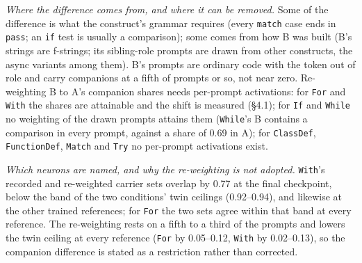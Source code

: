 \documentclass{article}
\begin{document}
\emph{Where the difference comes from, and where it can be removed.} Some of the difference is what the construct's grammar requires (every \texttt{match} case ends in \texttt{pass}; an \texttt{if} test is usually a comparison); some comes from how B was built (B's strings are f-strings; its sibling-role prompts are drawn from other constructs, the async variants among them). B's prompts are ordinary code with the token out of role and carry companions at a fifth of prompts or so, not near zero. Re-weighting B to A's companion shares needs per-prompt activations: for \texttt{For} and \texttt{With} the shares are attainable and the shift is measured (\S4.1); for \texttt{If} and \texttt{While} no weighting of the drawn prompts attains them (\texttt{While}'s B contains a comparison in every prompt, against a share of 0.69 in A); for \texttt{ClassDef}, \texttt{FunctionDef}, \texttt{Match} and \texttt{Try} no per-prompt activations exist.

\emph{Which neurons are named, and why the re-weighting is not adopted.} \texttt{With}'s recorded and re-weighted carrier sets overlap by 0.77 at the final checkpoint, below the band of the two conditions' twin ceilings (0.92--0.94), and likewise at the other trained references; for \texttt{For} the two sets agree within that band at every reference. The re-weighting rests on a fifth to a third of the prompts and lowers the twin ceiling at every reference (\texttt{For} by 0.05--0.12, \texttt{With} by 0.02--0.13), so the companion difference is stated as a restriction rather than corrected.
\end{document}
